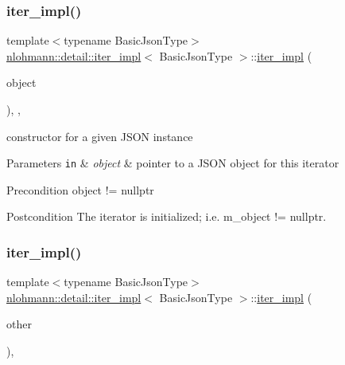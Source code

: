 \subsubsection{\texorpdfstring{iter\+\_\+impl()}{iter\_impl()}\hspace{0.1cm}{\footnotesize\ttfamily [2/3]}}
{\footnotesize\ttfamily template$<$typename Basic\+Json\+Type$>$ \\
\hyperlink{classnlohmann_1_1detail_1_1iter__impl}{nlohmann\+::detail\+::iter\+\_\+impl}$<$ Basic\+Json\+Type $>$\+::\hyperlink{classnlohmann_1_1detail_1_1iter__impl}{iter\+\_\+impl} (\begin{DoxyParamCaption}\item[{\hyperlink{classnlohmann_1_1detail_1_1iter__impl_a69e52f890ce8c556fd68ce109e24b360}{pointer}}]{object }\end{DoxyParamCaption})\hspace{0.3cm}{\ttfamily [inline]}, {\ttfamily [explicit]}, {\ttfamily [noexcept]}}



constructor for a given J\+S\+ON instance 


\begin{DoxyParams}[1]{Parameters}
\mbox{\tt in}  & {\em object} & pointer to a J\+S\+ON object for this iterator \\
\hline
\end{DoxyParams}
\begin{DoxyPrecond}{Precondition}
object != nullptr 
\end{DoxyPrecond}
\begin{DoxyPostcond}{Postcondition}
The iterator is initialized; i.\+e. {\ttfamily m\+\_\+object != nullptr}. 
\end{DoxyPostcond}
\mbox{\label{classnlohmann_1_1detail_1_1iter__impl_a867f7eb55091be31b013adb3e46816d3}} 
\subsubsection{\texorpdfstring{iter\+\_\+impl()}{iter\_impl()}\hspace{0.1cm}{\footnotesize\ttfamily [3/3]}}
{\footnotesize\ttfamily template$<$typename Basic\+Json\+Type$>$ \\
\hyperlink{classnlohmann_1_1detail_1_1iter__impl}{nlohmann\+::detail\+::iter\+\_\+impl}$<$ Basic\+Json\+Type $>$\+::\hyperlink{classnlohmann_1_1detail_1_1iter__impl}{iter\+\_\+impl} (\begin{DoxyParamCaption}\item[{const \hyperlink{classnlohmann_1_1detail_1_1iter__impl}{iter\+\_\+impl}$<$ typename std\+::remove\+\_\+const$<$ Basic\+Json\+Type $>$\+::type $>$ \&}]{other }\end{DoxyParamCaption})\hspace{0.3cm}{\ttfamily [inline]}, {\ttfamily [noexcept]}}



